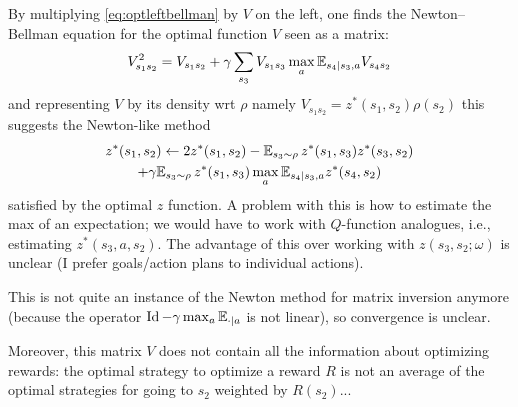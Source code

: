 \documentclass[11pt,a4paper]{article}
\begin{document}
By multiplying \eqref{eq:optleftbellman} by $V$ on the left, one finds the
Newton--Bellman equation for the optimal function $V$ seen as a matrix:
\begin{equation}
V^2_{s_1s_2}=V_{s_1s_2}+\gamma \sum_{s_3} V_{s_1s_3}\max_a
\mathbb{E}_{s_4|s_3,a} V_{s_4s_2}
\end{equation}
and representing $V$ by its density wrt $\rho$ namely
$V_{s_1s_2}=z^\ast(s_1,s_2)\rho(s_2)$ this suggests the Newton-like method
\begin{multline}
z^\ast(s_1,s_2)\gets 2z^\ast(s_1,s_2)-\mathbb{E}_{s_3\sim \rho}\,
z^\ast(s_1,s_3)z^\ast(s_3,s_2)\\
+\gamma
\mathbb{E}_{s_3\sim \rho} \,z^\ast(s_1,s_3)\max_a \mathbb{E}_{s_4|s_3,a} z^\ast(s_4,s_2)
\end{multline}
satisfied by the optimal $z$ function. A problem with this is how to
estimate the max of an expectation; we would have to work with
$Q$-function analogues, i.e., estimating $z^\ast(s_3,a,s_2)$. The
advantage of this over working with $z(s_3,s_2;\omega)$ is unclear (I
prefer goals/action plans to individual actions).

This is not quite an instance of the Newton method for matrix inversion
anymore (because the operator $\operatorname{Id}-\gamma \max_a \mathbb{E}_{\cdot|a}$ is not
linear), so convergence is unclear.

Moreover, this matrix $V$ does not contain all the information about
optimizing rewards: the optimal strategy to optimize a reward $R$ is not
an average of the optimal strategies for going to $s_2$ weighted by
$R(s_2)$...
\end{document}
